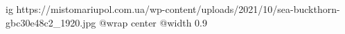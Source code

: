  
 
 
 
 

\ifcmt
  ig https://mistomariupol.com.ua/wp-content/uploads/2021/10/sea-buckthorn-gbc30e48c2_1920.jpg
  @wrap center
  @width 0.9
\fi
